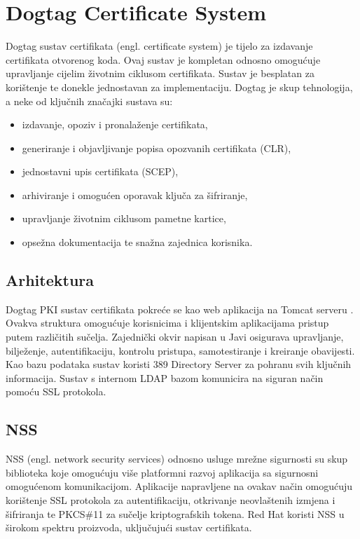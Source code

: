 \documentclass[]{foi}
\begin{document}
\pagebreak

\section{Dogtag Certificate System}

Dogtag sustav certifikata (engl. certificate system) \cite{dogtagpki} je tijelo za izdavanje certifikata otvorenog koda.
Ovaj sustav je kompletan odnosno omogućuje upravljanje cijelim životnim ciklusom certifikata.
Sustav je besplatan za korištenje te donekle jednostavan za implementaciju.
Dogtag je skup tehnologija, a neke od ključnih značajki sustava su:

\begin{itemize}[noitemsep,topsep=0pt]
    \item izdavanje, opoziv i pronalaženje certifikata,
    \item generiranje i objavljivanje popisa opozvanih certifikata (CLR),
    \item jednostavni upis certifikata (SCEP),
    \item arhiviranje i omogućen oporavak ključa za šifriranje,
    \item upravljanje životnim ciklusom pametne kartice,
    \item opsežna dokumentacija te snažna zajednica korisnika.
\end{itemize}


\subsection{Arhitektura}

Dogtag PKI sustav certifikata pokreće se kao web aplikacija na Tomcat serveru \cite{dogtagpki-architecture}.
Ovakva struktura omogućuje korisnicima i klijentskim aplikacijama pristup putem različitih sučelja.
Zajednički okvir napisan u Javi osigurava upravljanje, bilježenje, autentifikaciju, kontrolu pristupa, samotestiranje i kreiranje obavijesti.
Kao bazu podataka sustav koristi 389 Directory Server za pohranu svih ključnih informacija.
Sustav s internom LDAP bazom komunicira na siguran način pomoću SSL protokola.
\subsection{NSS}
NSS (engl. network security services) odnosno usluge mrežne sigurnosti su skup biblioteka koje omogućuju više platformni razvoj aplikacija sa sigurnosni omogućenom komunikacijom.
Aplikacije napravljene na ovakav način omogućuju korištenje SSL protokola za autentifikaciju, otkrivanje neovlaštenih izmjena i šifriranja te PKCS\#11 za sučelje kriptografskih tokena.
Red Hat koristi NSS u širokom spektru proizvoda, uključujući sustav certifikata.
\end{document}
